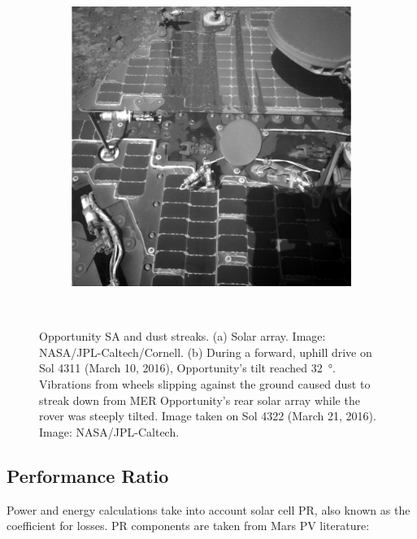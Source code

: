 \begin{figure}[h]
\begin{subfigure}[t]{\subfigureWidth}
            \includegraphics[height=\graphicsHeight]{sections/mars-solar-energy/photovoltaic-energy/images/mer-opportunity-dust-streaks.png}
            \label{fig:image:mer-opportunity-dust-streaks}
    \end{subfigure}\\[0.8ex]
    \caption[Opportunity solar arrays and dust streaks]
    {Opportunity \ac{SA} and dust streaks. (a) Solar array. Image: \ac{NASA}/\ac{JPL}-Caltech/Cornell. (b) During a forward, uphill drive on Sol 4311 (March 10, 2016), Opportunity's tilt reached \SI{32}{\degree}. Vibrations from wheels slipping against the ground caused dust to streak down from \ac{MER} Opportunity's rear solar array while the rover was steeply tilted. Image taken on Sol 4322 (March 21, 2016). Image: \ac{NASA}/\ac{JPL}-Caltech.}
    \label{fig:mer-solar-arrays-and-dust-streaks}
\vspace{-2ex}
\end{figure}


\subsection{Performance Ratio}
\label{sec:PowerAndEnergyPredictions:PerformanceRatio}
Power and energy calculations take into account solar cell \ac{PR}, also known as the coefficient for losses. \ac{PR} components are taken from Mars \ac{PV} literature:


